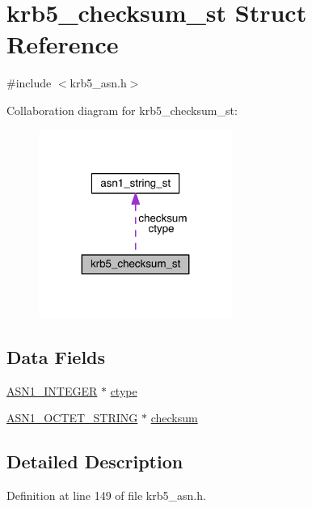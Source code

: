\hypertarget{structkrb5__checksum__st}{}\section{krb5\+\_\+checksum\+\_\+st Struct Reference}
\label{structkrb5__checksum__st}


{\ttfamily \#include $<$krb5\+\_\+asn.\+h$>$}



Collaboration diagram for krb5\+\_\+checksum\+\_\+st\+:\nopagebreak
\begin{figure}[H]
\begin{center}
\leavevmode
\includegraphics[width=179pt]{structkrb5__checksum__st__coll__graph}
\end{center}
\end{figure}
\subsection*{Data Fields}
\begin{DoxyCompactItemize}
\item 
\hyperlink{crypto_2ossl__typ_8h_af4335399bf9774cb410a5e93de65998b}{A\+S\+N1\+\_\+\+I\+N\+T\+E\+G\+ER} $\ast$ \hyperlink{structkrb5__checksum__st_affcb86df0d94a51a34855a1858e2934d}{ctype}
\item 
\hyperlink{crypto_2ossl__typ_8h_afbd05e94e0f0430a2b729473efec88c1}{A\+S\+N1\+\_\+\+O\+C\+T\+E\+T\+\_\+\+S\+T\+R\+I\+NG} $\ast$ \hyperlink{structkrb5__checksum__st_a6c5e04de8c6704cd6c9614b82a597c08}{checksum}
\end{DoxyCompactItemize}


\subsection{Detailed Description}


Definition at line 149 of file krb5\+\_\+asn.\+h.



